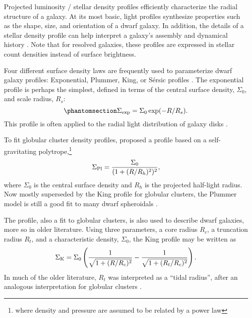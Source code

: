 Projected luminosity / stellar density profiles efficiently characterize
the radial structure of a galaxy. At its most basic, light profiles
synthesize properties such as the shape, size, and orientation of a
dwarf galaxy. In addition, the details of a stellar density profile can
help interpret a galaxy's assembly and dynamical history
\citep[e.g.,][]{penarrubia+2009, lee+2018, querci+2025}. Note that for
resolved galaxies, these profiles are expressed in stellar count
densities instead of surface brightness.

Four different surface density laws are frequently used to parameterize
dwarf galaxy profiles: Exponential, Plummer, King, or Sérsic profiles
\citep[e.g.,][]{munoz+2018}. The exponential profile is perhaps the
simplest, defined in terms of the central surface density, \(\Sigma_0\),
and scale radius, \(R_s\):
\begin{equation}\protect\phantomsection\label{eq:exponential_law}{
\Sigma_{\rm exp} = \Sigma_0\exp(-R / R_s).
}\end{equation} This profile is often applied to the radial light
distribution of galaxy disks
\citep{devaucouleurs1959a, freeman1970, kent1985}.

To fit globular cluster density profiles, \citet{plummer1911} proposed a
profile based on a self-gravitating polytrope,\footnote{where density
  and pressure are assumed to be related by a power law}
\begin{equation}{
\Sigma_{\rm Pl} = \frac{\Sigma_0}{(1 + (R/R_h)^2)^2},
}\end{equation} where \(\Sigma_0\) is the central surface density and
\(R_h\) is the projected half-light radius. Now mostly superseded by the
King profile for globular clusters, the Plummer model is still a good
fit to many dwarf spheroidals \citep[e.g.,][]{moskowitz+walker2020}.

The \citet{king1962} profile, also a fit to globular clusters, is also
used to describe dwarf galaxies, more so in older literature. Using
three parameters, a core radius \(R_c\), a truncation radius \(R_t\),
and a characteristic density, \(\Sigma_0\), the King profile may be
written as \begin{equation}{
\Sigma_{\rm K} = \Sigma_0\left(\frac{1}{\sqrt{1 + (R/R_c)^2}} - \frac{1}{\sqrt{1+(R_t/R_c)^2}}\right).
}\end{equation} In much of the older literature, \(R_t\) was interpreted
as a ``tidal radius'', after an analogous interpretation for globular
clusters \citep[e.g.,][]{hodge1961, IH1995}.

